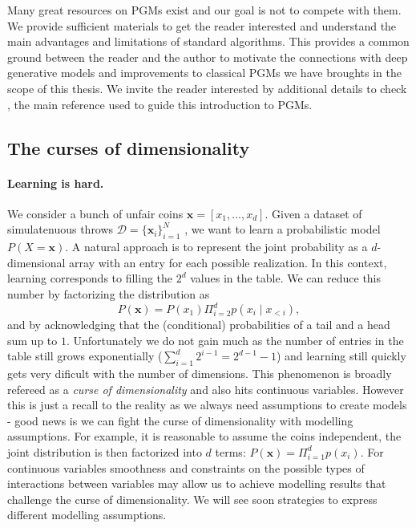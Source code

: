 Many great resources on PGMs exist and our goal is not to compete with them. We provide sufficient materials to get the reader interested and understand the main advantages and limitations of standard algorithms. This provides a common ground between the reader and the author to motivate the connections with deep generative models and improvements to classical PGMs we have broughts in the scope of this thesis. We invite the reader interested by additional details to check \citet{}, the main reference used to guide this introduction to PGMs.

\subsection{The curses of dimensionality}
\paragraph{Learning is hard.} We consider a bunch of unfair coins $\bm{x} = \left[x_1, \dots, x_d \right]$. Given a dataset of simulatenuous throws $\mathcal{D} = \{\bm{x}_i\}_{i=1}^N$ , we want to learn a probabilistic model $P(X=\bm{x})$. A natural approach is to represent the joint probability as a $d$-dimensional array with an entry for each possible realization. In this context, learning corresponds to filling the $2^d$ values in the table. We can reduce this number by factorizing the distribution as
$$P(\bm{x}) = P(x_1)\Pi_{i=2}^d p(x_i\mid x_{<i}),$$ and by acknowledging that the (conditional) probabilities of a tail and a head sum up to $1$. Unfortunately we do not gain much as the number of entries in the table still grows exponentially ($\sum_{i=1}^d 2^{i-1} = 2^{d-1} - 1$) and learning still quickly gets very dificult with the number of dimensions. This phenomenon is broadly refereed as a \textit{curse of dimensionality} and also hits continuous variables. However this is just a recall to the reality as we always need assumptions to create models - good news is we can fight the curse of dimensionality with modelling assumptions. For example, it is reasonable to assume the coins independent, the joint distribution is then factorized into $d$ terms: $ P(\bm{x}) = \Pi_{i=1}^d p(x_i)$. For continuous variables smoothness and constraints on the possible types of interactions between variables may allow us to achieve modelling results that challenge the curse of dimensionality. We will see soon strategies to express different modelling assumptions.

